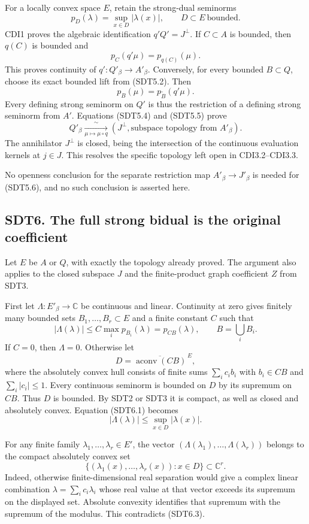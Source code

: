 For a locally convex space \(E\), retain the strong-dual seminorms \[
p_D(\lambda)=\sup_{x\in D}|\lambda(x)|,
\qquad D\subset E\ \text{bounded}.
\tag{SDT5.3}
\] CDI1 proves the algebraic identification \(q'Q'=J^\perp\). If
\(C\subset A\) is bounded, then \(q(C)\) is bounded and \[
p_C(q'\mu)=p_{q(C)}(\mu).
\tag{SDT5.4}
\] This proves continuity of \(q':Q'_\beta\to A'_\beta\). Conversely,
for every bounded \(B\subset Q\), choose its exact bounded lift from
(SDT5.2). Then \[
p_B(\mu)=p_{\widetilde B}(q'\mu).
\tag{SDT5.5}
\] Every defining strong seminorm on \(Q'\) is thus the restriction of a
defining strong seminorm from \(A'\). Equations (SDT5.4) and (SDT5.5)
prove \[
\boxed{Q'_\beta\xrightarrow[\mu\mapsto\mu\circ q]{\ \sim\ }
(J^\perp,\text{subspace topology from }A'_\beta).}
\tag{SDT5.6}
\] The annihilator \(J^\perp\) is closed, being the intersection of the
continuous evaluation kernels at \(j\in J\). This resolves the specific
topology left open in CDI3.2--CDI3.3.

No openness conclusion for the separate restriction map
\(A'_\beta\to J'_\beta\) is needed for (SDT5.6), and no such conclusion
is asserted here.

\subsection{SDT6. The full strong bidual is the original
coefficient}\label{sdt6.-the-full-strong-bidual-is-the-original-coefficient}

Let \(E\) be \(A\) or \(Q\), with exactly the topology already proved.
The argument also applies to the closed subspace \(J\) and the
finite-product graph coefficient \(Z\) from SDT3.

First let \(\Lambda:E'_\beta\to\mathbb C\) be continuous and linear.
Continuity at zero gives finitely many bounded sets
\(B_1,\ldots,B_r\subset E\) and a finite constant \(C\) such that \[
|\Lambda(\lambda)|\le C\max_i p_{B_i}(\lambda)
=p_{C B}(\lambda),\qquad B=\bigcup_i B_i.
\tag{SDT6.1}
\] If \(C=0\), then \(\Lambda=0\). Otherwise let \[
D=\overline{\operatorname{aconv}(CB)}^{\,E},
\tag{SDT6.2}
\] where the absolutely convex hull consists of finite sums
\(\sum_i c_i b_i\) with \(b_i\in CB\) and \(\sum_i|c_i|\le1\). Every
continuous seminorm is bounded on \(D\) by its supremum on \(CB\). Thus
\(D\) is bounded. By SDT2 or SDT3 it is compact, as well as closed and
absolutely convex. Equation (SDT6.1) becomes \[
|\Lambda(\lambda)|\le\sup_{x\in D}|\lambda(x)|.
\tag{SDT6.3}
\]

For any finite family \(\lambda_1,\ldots,\lambda_r\in E'\), the vector
\((\Lambda(\lambda_1),\ldots,\Lambda(\lambda_r))\) belongs to the
compact absolutely convex set \[
\{(\lambda_1(x),\ldots,\lambda_r(x)):x\in D\}\subset\mathbb C^r.
\tag{SDT6.4}
\] Indeed, otherwise finite-dimensional real separation would give a
complex linear combination \(\lambda=\sum_i c_i\lambda_i\) whose real
value at that vector exceeds its supremum on the displayed set. Absolute
convexity identifies that supremum with the supremum of the modulus.
This contradicts (SDT6.3).

